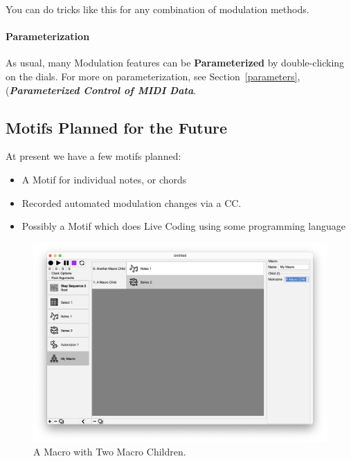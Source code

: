 \documentclass[twoside,10pt]{article}
\begin{document}
You can do tricks like this for any combination of modulation methods.

\paragraph{Parameterization}

As usual, many Modulation features can be {\bf Parameterized} by double-clicking on the dials.  For more on parameterization, see Section~\ref{parameters}, (\textbf{\textit{Parameterized Control of MIDI Data}}.





\clearpage\subsection{Motifs Planned for the Future}

At present we have a few motifs planned:

\begin{itemize}
\item A Motif for individual notes, or chords
\item Recorded automated modulation changes via a CC.
\item Possibly a Motif which does Live Coding using some programming language
\end{itemize}

\clearpage

\begin{figure}[t]
\centering
\includegraphics[width=6.5in]{Macro}
\vspace{-3em}
\caption{A Macro with Two Macro Children.}
\label{macro}
\end{figure}
\end{document}
